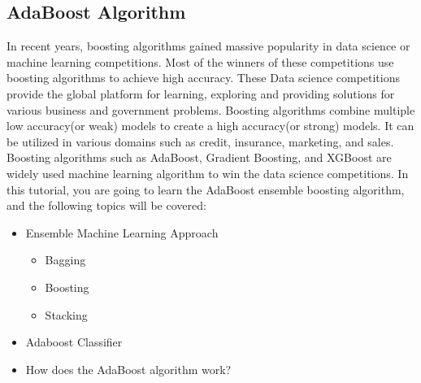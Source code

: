     \subsection{AdaBoost Algorithm}
        In recent years, boosting algorithms gained massive popularity in data science or machine learning competitions. Most of the winners of these competitions use boosting algorithms to achieve high accuracy. These Data science competitions provide 
        the global platform for learning, exploring and providing solutions for various business and government problems. Boosting algorithms combine multiple low accuracy(or weak) models to create a high accuracy(or strong) models. It can be utilized in 
        various domains such as credit, insurance, marketing, and sales. Boosting algorithms such as AdaBoost, Gradient Boosting, and XGBoost are widely used machine learning algorithm to win the data science competitions. In this tutorial, you are going 
        to learn the AdaBoost ensemble boosting algorithm, and the following topics will be covered:
        \begin{itemize}
            \item Ensemble Machine Learning Approach
                \begin{itemize}
                    \item Bagging
                    \item Boosting
                    \item Stacking  
                \end{itemize}
            \item Adaboost Classifier
            \item How does the AdaBoost algorithm work?
        \end{itemize}
